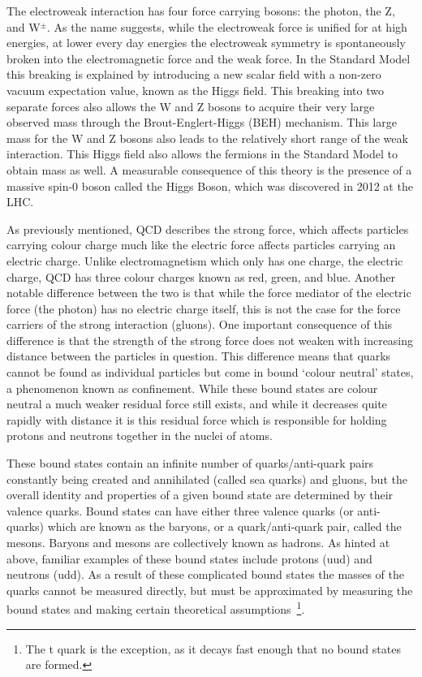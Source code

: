 The electroweak interaction has four force carrying bosons: the photon, the Z, and W$^{\pm}$.  
As the name suggests, while the electroweak force is unified for at high energies, at lower every day energies the electroweak symmetry is spontaneously broken into the electromagnetic force and the weak force.  
In the Standard Model this breaking is explained by introducing a new scalar field with a non-zero vacuum expectation value, known as the Higgs field.  
This breaking into two separate forces also allows the W and Z bosons to acquire their very large observed mass through the Brout-Englert-Higgs (BEH) mechanism.  
This large mass for the W and Z bosons also leads to the relatively short range of the weak interaction.  
This Higgs field also allows the fermions in the Standard Model to obtain mass as well.  
A measurable consequence of this theory is the presence of a massive spin-0 boson called the Higgs Boson, which was discovered in 2012 at the \gls{LHC}.  

As previously mentioned, \gls{QCD} describes the strong force, which affects particles carrying colour charge much like the electric force affects particles carrying an electric charge.  
Unlike electromagnetism which only has one charge, the electric charge, \gls{QCD} has three colour charges known as red, green, and blue.  
Another notable difference between the two is that while the force mediator of the electric force (the photon) has no electric charge itself, this is not the case for the force carriers of the strong interaction (gluons).  
One important consequence of this difference is that the strength of the strong force does not weaken with increasing distance between the particles in question.  
This difference means that quarks cannot be found as individual particles but come in bound `colour neutral' states, a phenomenon known as confinement.  
While these bound states are colour neutral a much weaker residual force still exists, and while it decreases quite rapidly with distance it is this residual force which is responsible for holding protons and neutrons together in the nuclei of atoms.  

These bound states contain an infinite number of quarks/anti-quark pairs constantly being created and annihilated (called sea quarks) and gluons, but the overall identity and properties of a given bound state are determined by their valence quarks.  
Bound states can have either three valence quarks (or anti-quarks) which are known as the baryons, or a quark/anti-quark pair, called the mesons.  
Baryons and mesons are collectively known as hadrons.  
As hinted at above, familiar examples of these bound states include protons (uud) and neutrons (udd).  
As a result of these complicated bound states the masses of the quarks cannot be measured directly, but must be approximated by measuring the bound states and making certain theoretical assumptions~\footnote{The t quark is the exception, as it decays fast enough that no bound states are formed.}.
 

